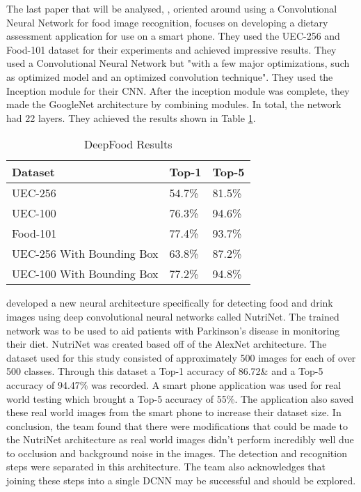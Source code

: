 The last paper that will be analysed, \parencite{deepFood}, oriented around using a Convolutional Neural
Network for food image recognition, focuses on developing a dietary assessment
application for use on a smart phone. They used the UEC-256 and Food-101 dataset
for their experiments and achieved impressive results.
They used a Convolutional Neural Network but "with a few major optimizations,
such as optimized model and an optimized convolution technique". 
They used the Inception module for their CNN. After the
inception module was complete, they made the GoogleNet architecture by combining modules. In
total, the network had 22 layers.
They achieved the results shown in Table \ref{resultsDeepFood}.

\begin{table}[h]
	\centering
	\caption{DeepFood Results}
	\label{resultsDeepFood}
	\begin{tabular}{|l|l|l|}
	\hline
		\textbf{Dataset} & \textbf{Top-1}  & \textbf{Top-5}  \\  \hline
		UEC-256                   & 54.7\% & 81.5\% \\ \hline
		UEC-100                   & 76.3\% & 94.6\% \\ \hline
		Food-101                  & 77.4\% & 93.7\% \\ \hline
		UEC-256 With Bounding Box & 63.8\% & 87.2\% \\ \hline
		  UEC-100 With Bounding Box & 77.2\% & 94.8\% \\ \hline
	\end{tabular}
\end{table}

\parencite{nutrinet} developed a new neural architecture specifically for detecting food and drink images using deep convolutional neural networks called NutriNet.
The trained network was to be used to aid patients with Parkinson's disease in monitoring their diet.
NutriNet was created based off of the AlexNet architecture.
The dataset used for this study consisted of approximately 500 images for each of over 500 classes.
Through this dataset a Top-1 accuracy of 86.72\& and a Top-5 accuracy of 94.47\% was recorded.
A smart phone application was used for real world testing which brought a Top-5 accuracy of 55\%.
The application also saved these real world images from the smart phone to increase their dataset size.
In conclusion, the team found that there were modifications that could be made to the NutriNet architecture as real world images didn't perform incredibly well due to occlusion and background noise in the images.
The detection and recognition steps were separated in this architecture.
The team also acknowledges that joining these steps into a single DCNN may be successful and should be explored.

